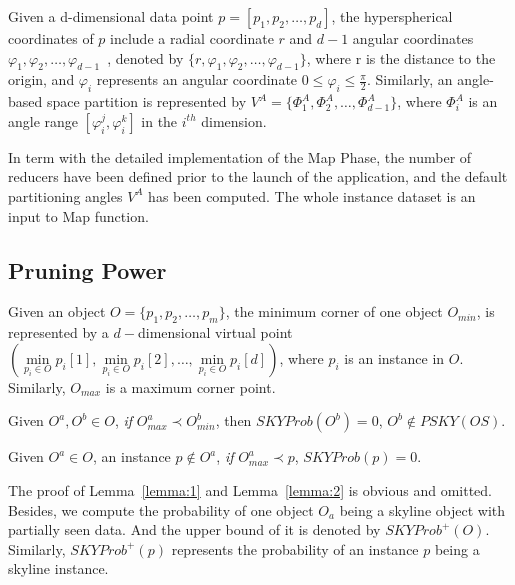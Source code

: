 Given a d-dimensional data point $p = [p_1, p_2, \dots, p_d]$, the hyperspherical coordinates of $p$ include a radial coordinate $r$ and $d-1$ angular coordinates $\varphi_1, \varphi_2, \dots, \varphi_{d-1}$~\cite{ref:AngularPartition}, denoted by $\{r, \varphi_1, \varphi_2, \dots, \varphi_{d-1}\}$, where r is the distance to the origin, and $\varphi_i$ represents an angular coordinate $ 0 \leq  \varphi_i \leq \frac{\pi}{2}$. Similarly, an angle-based space partition is represented by $V^A = \{\Phi_1^A, \Phi_2^A, \dots, \Phi_{d-1}^A \}$, where $\Phi_i^A$ is an angle range $[\varphi_i^j,\varphi_i^k]$ in the $i^{th}$ dimension.

In term with the detailed implementation of the Map Phase, the number of reducers have been defined prior to the launch of the application, and the default partitioning angles $V^A$ has been computed. The whole instance dataset is an input to Map function. 


\subsection{Pruning Power}
Given an object $O = \{p_1, p_2, \dots, p_m\}$, the minimum corner of one object $O_{min}$, is represented by a $d-$dimensional virtual point $( \min\limits_{p_i \in O}p_i[1], \min\limits_{p_i \in O}p_i[2], \dots, \min\limits_{p_i \in O}p_i[d])$, where $p_i$ is an instance in $O$. Similarly, $O_{max}$ is a maximum corner point.

\vspace{5 mm}
\begin{lemma}
\label{lemma:1}
Given $O^a, O^b \in O$, \emph{if} $O^a_{max} \prec O^b_{min}$, then $SKYProb(O^b) = 0$, $O^b \notin PSKY(OS)$.
\end{lemma}

\vspace{5 mm}

\begin{lemma}
\label{lemma:2}
Given $O^a \in O$, an instance $p \notin O^a$, \emph{if} $O^a_{max} \prec p$, $SKYProb(p) = 0$.
\end{lemma}

\vspace{5 mm}

The proof of Lemma~\ref{lemma:1} and Lemma~\ref{lemma:2} is obvious and omitted.
Besides, we compute the probability of one object $O_a$ being a skyline object with partially seen data. And the upper bound of it is denoted by $SKYProb^{+}(O)$. Similarly, $SKYProb^{+}(p)$ represents the probability of an instance $p$ being a skyline instance.

